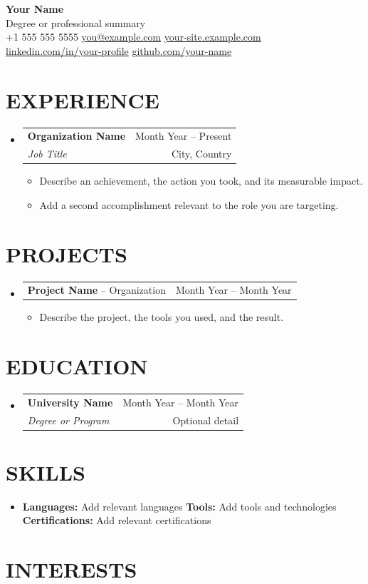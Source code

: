 \documentclass[letterpaper,11pt]{article}
\makeatletter
\newcommand{\contactsep}{\hspace{7pt}{\color{light-grey}|}\hspace{7pt}}
\newcommand{\contact}[2]{#1\hspace{4pt}#2}
\newcommand{\resumeItem}[1]{\item\small{#1 \vspace{-2pt}}}
\newcommand{\resumeSubheading}[4]{\vspace{-1pt}\item
  \begin{tabular*}{\textwidth}[t]{l@{\extracolsep{\fill}}r}
    \textbf{#1} & {\color{dark-grey}\small #2}\\
    \textit{#3} & {\color{dark-grey}\small #4}\\
  \end{tabular*}\vspace{-6pt}}
\newcommand{\resumeProjectHeading}[2]{\item
  \begin{tabular*}{\textwidth}{l@{\extracolsep{\fill}}r}
    #1 & {\color{dark-grey}#2}\\
  \end{tabular*}\vspace{-6pt}}
\newcommand{\resumeSubHeadingListStart}{\begin{itemize}[leftmargin=0in,label={}]}
\newcommand{\resumeSubHeadingListEnd}{\end{itemize}}
\newcommand{\resumeItemListStart}{\begin{itemize}}
\newcommand{\resumeItemListEnd}{\end{itemize}\vspace{-4pt}}
\makeatother
\begin{document}
\begin{center}
  {\Huge \textbf{Your Name}} \\[5pt]
  {\color{dark-grey}\small Degree or professional summary} \\[5pt]
  \small
  \contact{\faPhone*}{+1 555 555 5555} \contactsep
  \contact{\faEnvelope}{\href{mailto:you@example.com}{you@example.com}} \contactsep
  \contact{\faGlobe}{\href{https://your-site.example.com}{your-site.example.com}} \\[3pt]
  \contact{\faLinkedin}{\href{https://linkedin.com/in/your-profile}{linkedin.com/in/your-profile}} \contactsep
  \contact{\faGithub}{\href{https://github.com/your-name}{github.com/your-name}}
\end{center}
\vspace{-14pt}

\section{EXPERIENCE}
\resumeSubHeadingListStart
  \resumeSubheading{Organization Name}{Month Year -- Present}{Job Title}{City, Country}
  \resumeItemListStart
    \resumeItem{Describe an achievement, the action you took, and its measurable impact.}
    \resumeItem{Add a second accomplishment relevant to the role you are targeting.}
  \resumeItemListEnd
\resumeSubHeadingListEnd

\section{PROJECTS}
\resumeSubHeadingListStart
  \resumeProjectHeading{\textbf{Project Name} -- Organization}{Month Year -- Month Year}
  \resumeItemListStart
    \resumeItem{Describe the project, the tools you used, and the result.}
  \resumeItemListEnd
\resumeSubHeadingListEnd

\section{EDUCATION}
\resumeSubHeadingListStart
  \resumeSubheading{University Name}{Month Year -- Month Year}{Degree or Program}{Optional detail}
\resumeSubHeadingListEnd

\section{SKILLS}
\begin{itemize}[leftmargin=0in,label={}]
  \item{\small \textbf{Languages:} Add relevant languages \newline
  \textbf{Tools:} Add tools and technologies \newline
  \textbf{Certifications:} Add relevant certifications}
\end{itemize}

\section{INTERESTS}
\end{document}
